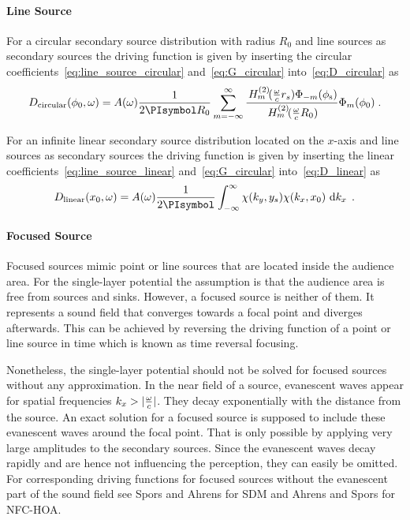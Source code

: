 \paragraph{Line Source}
%
For a circular secondary source distribution with radius $R_0$ and line sources
as secondary sources the driving function is given by inserting the
circular coefficients~\eqref{eq:line_source_circular} and~\eqref{eq:G_circular}
into~\eqref{eq:D_circular} as
%
\begin{equation}
    D_{\text{circular}}(\phi_0,\omega) = A(\omega) \frac{1}{2\PI R_0}
        \sum_{m=-\infty}^{\infty}
        \frac{\H{m}{2}(\omegac r_s) \Phi_{-m}(\phi_\text{s})}
        {\H{m}{2}(\omegac R_0)} \Phi_m(\phi_0) \qp
    \label{eq:D_nfchoa_ls_2D}
\end{equation}
%

For an infinite linear secondary source distribution located on the $x$-axis and
line sources as secondary sources the driving function is given by inserting the
linear coefficients~\eqref{eq:line_source_linear} and~\eqref{eq:G_circular}
into~\eqref{eq:D_linear} as
%
\begin{equation}
    D_\text{linear}(x_0,\omega) = A(\omega) \frac{1}{2\PI}
    \int_{-\infty}^\infty \chi(k_y,y_s) \chi(k_x,x_0) \, \D{k_x} \qp
\end{equation}
%


\paragraph{Focused Source}
%
Focused sources mimic point or line sources that are located inside the audience
area. For the single-layer potential the assumption is that the audience area is
free from sources and sinks. However, a focused source is neither of them. It
represents a sound field that converges towards a focal point and diverges
afterwards. This can be achieved by reversing the driving function of a point or
line source in time which is known as time reversal
focusing.

Nonetheless, the single-layer potential should not be solved for focused sources
without any approximation. In the near field of a source,
evanescent
waves appear for spatial frequencies $k_x > |\frac{\omega}{c}|$.
They decay exponentially with the distance from the source. An exact solution for a focused
source is supposed to include these evanescent waves around the focal point.
That is only
possible by applying very large amplitudes to the secondary
sources.
Since the evanescent waves decay rapidly and are hence not
influencing the perception, they can easily be omitted.
For corresponding driving functions for focused sources without the
evanescent part of the sound field see Spors and
Ahrens for
\ac{SDM} and Ahrens and Spors for \ac{NFC-HOA}.

